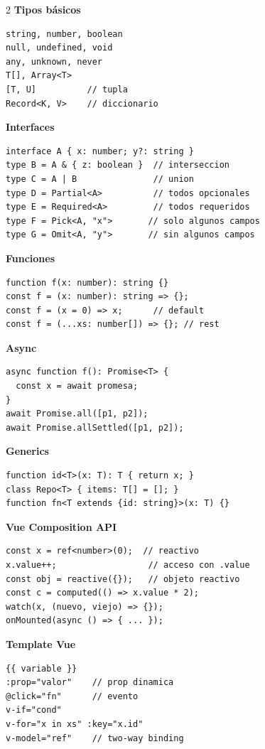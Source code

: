 \documentclass[11pt,a4paper]{article}
\begin{document}
\begin{multicols}{2}
\textbf{\textcolor{tsblue}{Tipos básicos}}
\begin{lstlisting}[style=typescript,numbers=none]
string, number, boolean
null, undefined, void
any, unknown, never
T[], Array<T>
[T, U]          // tupla
Record<K, V>    // diccionario
\end{lstlisting}

\textbf{\textcolor{tsblue}{Interfaces}}
\begin{lstlisting}[style=typescript,numbers=none]
interface A { x: number; y?: string }
type B = A & { z: boolean }  // interseccion
type C = A | B               // union
type D = Partial<A>          // todos opcionales
type E = Required<A>         // todos requeridos
type F = Pick<A, "x">       // solo algunos campos
type G = Omit<A, "y">       // sin algunos campos
\end{lstlisting}

\textbf{\textcolor{tsblue}{Funciones}}
\begin{lstlisting}[style=typescript,numbers=none]
function f(x: number): string {}
const f = (x: number): string => {};
const f = (x = 0) => x;      // default
const f = (...xs: number[]) => {}; // rest
\end{lstlisting}

\textbf{\textcolor{tsblue}{Async}}
\begin{lstlisting}[style=typescript,numbers=none]
async function f(): Promise<T> {
  const x = await promesa;
}
await Promise.all([p1, p2]);
await Promise.allSettled([p1, p2]);
\end{lstlisting}

\columnbreak

\textbf{\textcolor{tsblue}{Generics}}
\begin{lstlisting}[style=typescript,numbers=none]
function id<T>(x: T): T { return x; }
class Repo<T> { items: T[] = []; }
function fn<T extends {id: string}>(x: T) {}
\end{lstlisting}

\textbf{\textcolor{vuegreen}{Vue Composition API}}
\begin{lstlisting}[style=typescript,numbers=none]
const x = ref<number>(0);  // reactivo
x.value++;                  // acceso con .value
const obj = reactive({});   // objeto reactivo
const c = computed(() => x.value * 2);
watch(x, (nuevo, viejo) => {});
onMounted(async () => { ... });
\end{lstlisting}

\textbf{\textcolor{vuegreen}{Template Vue}}
\begin{lstlisting}[style=typescript,numbers=none]
{{ variable }}
:prop="valor"    // prop dinamica
@click="fn"      // evento
v-if="cond"
v-for="x in xs" :key="x.id"
v-model="ref"    // two-way binding
\end{lstlisting}


\end{multicols}
\end{document}
